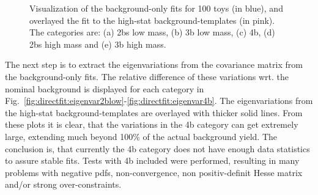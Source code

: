 \begin{figure}[htbp!]
\begin{center}
\caption{Visualization of the background-only fits for 100 toys (in blue), and overlayed the fit to the high-stat background-templates (in pink). The categories are: (a) 2bs low mass, (b) 3b low mass, (c) 4b, (d) 2bs high mass and (e) 3b high mass.}
\label{fig:directfit:pseudobkgfits}
\end{center}
\end{figure}

The next step is to extract the eigenvariations from the covariance matrix from the background-only fits. The relative difference of these variations wrt. the nominal background is displayed for each category in Fig.~\ref{fig:directfit:eigenvar2blow}-\ref{fig:directfit:eigenvar4b}. The eigenvariations from the high-stat background-templates are overlayed with thicker solid lines. From these plots it is clear, that the variations in the 4b category can get extremely large, extending much beyond 100\% of the actual background yield. The conclusion is, that currently the 4b category does not have enough data statistics to assure stable fits. Tests with 4b included were performed, resulting in many problems with negative pdfs, non-convergence, non positiv-definit Hesse matrix and/or strong over-constraints.

